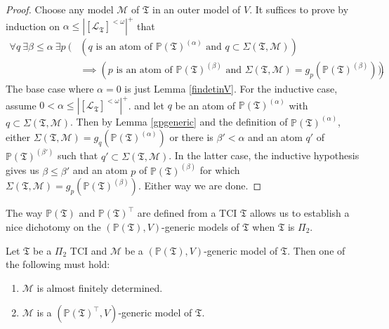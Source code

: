 \documentclass[12pt]{article}
\numberwithin{equation}{section}
\begin{document}
\begin{proof}
Choose any model $\mathcal{M}$ of $\mathfrak{T}$ in an outer model of $V$. It suffices to prove by induction on $\alpha \leq |[\mathcal{L}_{\mathfrak{T}}]^{< \omega}|^+$ that
\begin{align*}
    \forall q \ \exists \beta \leq \alpha \ \exists p \ ( & (q \text{ is an atom of } \mathbb{P}(\mathfrak{T})^{(\alpha)} \text{ and } q \subset \Sigma(\mathfrak{T}, \mathcal{M})) \\
    & \implies (p \text{ is an atom of } \mathbb{P}(\mathfrak{T})^{(\beta)} \text{ and } \Sigma(\mathfrak{T}, \mathcal{M}) = g_p (\mathbb{P}(\mathfrak{T})^{(\beta)}))) \text{.}
\end{align*}
The base case where $\alpha = 0$ is just Lemma \ref{findetinV}. For the inductive case, assume $0 < \alpha \leq |[\mathcal{L}_{\mathfrak{T}}]^{< \omega}|^+$. and let $q$ be an atom of $\mathbb{P}(\mathfrak{T})^{(\alpha)}$ with $q \subset \Sigma(\mathfrak{T}, \mathcal{M})$. Then by Lemma \ref{gpgeneric} and the definition of $\mathbb{P}(\mathfrak{T})^{(\alpha)}$, either $\Sigma(\mathfrak{T}, \mathcal{M}) = g_q (\mathbb{P}(\mathfrak{T})^{(\alpha)})$ or there is $\beta' < \alpha$ and an atom $q'$ of $\mathbb{P}(\mathfrak{T})^{(\beta')}$ such that $q' \subset \Sigma(\mathfrak{T}, \mathcal{M})$. In the latter case, the inductive hypothesis gives us $\beta \leq \beta'$ and an atom $p$ of $\mathbb{P}(\mathfrak{T})^{(\beta)}$ for which $\Sigma(\mathfrak{T}, \mathcal{M}) = g_p (\mathbb{P}(\mathfrak{T})^{(\beta)})$. Either way we are done.
\end{proof}

The way $\mathbb{P}(\mathfrak{T})$ and $\mathbb{P}(\mathfrak{T})^{\top}$ are defined from a TCI $\mathfrak{T}$ allows us to establish a nice dichotomy on the $(\mathbb{P}(\mathfrak{T}), V)$-generic models of $\mathfrak{T}$ when $\mathfrak{T}$ is $\Pi_2$.

\begin{lem}
Let $\mathfrak{T}$ be a $\Pi_2$ TCI and $\mathcal{M}$ be a $(\mathbb{P}(\mathfrak{T}), V)$-generic model of $\mathfrak{T}$. Then one of the following must hold:
\begin{enumerate}[label=(\arabic*)]
    \item $\mathcal{M}$ is almost finitely determined.
    \item $\mathcal{M}$ is a $(\mathbb{P}(\mathfrak{T})^{\top}, V)$-generic model of $\mathfrak{T}$.
\end{enumerate}
\end{lem}
\end{document}
